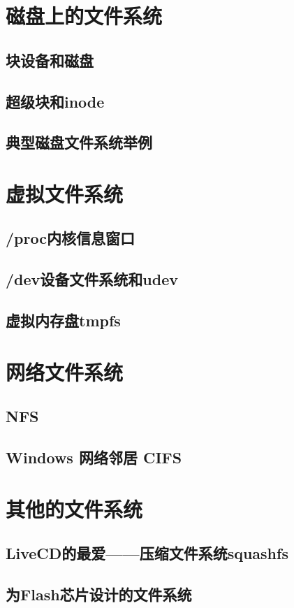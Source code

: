 \documentclass[amstex,twoside]{ctexbook}
\begin{document}
\section{磁盘上的文件系统	}
\subsection{块设备和磁盘}
\subsection{超级块和inode}
\subsection{典型磁盘文件系统举例}
\section{虚拟文件系统}
\subsection{/proc内核信息窗口}
\subsection{/dev设备文件系统和udev}
\subsection{虚拟内存盘tmpfs}
\section{网络文件系统	}
\subsection{NFS}
\subsection{Windows 网络邻居 CIFS}
\section{  其他的文件系统	}
\subsection{  LiveCD的最爱——压缩文件系统squashfs}
\subsection{  为Flash芯片设计的文件系统}
\end{document}
